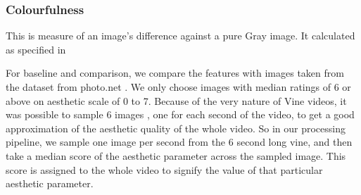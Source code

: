 \subsubsection{Colourfulness}
This is measure of an image's difference against a pure Gray image. It calculated as specified in \cite{yeh2010personalized}

\par
For baseline and comparison, we compare the features with images taken from the dataset from photo.net \cite{datta2008algorithmic}. We only choose images with median ratings of 6 or above on aesthetic scale of 0 to 7. 
Because of the very nature of Vine videos, it was possible to sample 6 images , one for each second of the video, to get a good approximation of the aesthetic quality of the whole video. So in our processing pipeline, we sample one image per second from the 6 second long vine, and then take a median score of the aesthetic parameter across the sampled image. This score is assigned to the whole video to signify the value of that particular aesthetic parameter. 

\begin{table}
\caption{List of Aesthetic parameters computed for highly rated aesthetic images, Popular videos and unpopular videos. Most parameters have no bias towards either popular or unpopular videos}

\label{aesthetic_table}
\end{table}

